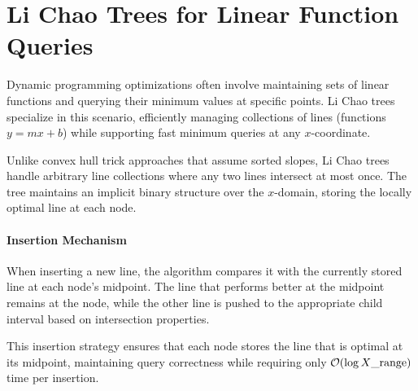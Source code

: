 \section{Li Chao Trees for Linear Function Queries}
\label{sec:li_chao_trees}

Dynamic programming optimizations often involve maintaining sets of linear functions and querying their minimum values at specific points. Li Chao trees specialize in this scenario, efficiently managing collections of lines (functions $y = mx + b$) while supporting fast minimum queries at any $x$-coordinate.

Unlike convex hull trick approaches that assume sorted slopes, Li Chao trees handle arbitrary line collections where any two lines intersect at most once. The tree maintains an implicit binary structure over the $x$-domain, storing the locally optimal line at each node.

\paragraph{Insertion Mechanism}

When inserting a new line, the algorithm compares it with the currently stored line at each node's midpoint. The line that performs better at the midpoint remains at the node, while the other line is pushed to the appropriate child interval based on intersection properties.

This insertion strategy ensures that each node stores the line that is optimal at its midpoint, maintaining query correctness while requiring only $\mathcal{O}(\log X\_{\text{range}})$ time per insertion.

